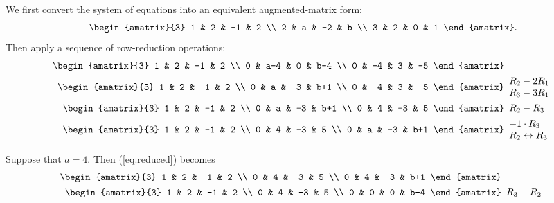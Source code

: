 \documentclass{article}
\begin{document}
We first convert the system of equations into an equivalent augmented-matrix
form:
\[
 \begin{amatrix}{3}
  1 & 2 & -1 & 2 \\
  2 & a & -2 & b \\
  3 & 2 & 0 & 1
 \end{amatrix}.
\]
Then apply a sequence of row-reduction operations:
\begin{align}
 \begin{amatrix}{3}
  1 &   2 & -1 &   2 \\
  0 & a-4 &  0 & b-4 \\
  0 &  -4 &  3 &  -5
 \end{amatrix} &  \nonumber \\
 \begin{amatrix}{3}
  1 &  2 & -1 &   2 \\
  0 &  a & -3 & b+1 \\
  0 & -4 &  3 &  -5
 \end{amatrix} & \begin{array}{l} R_2 - 2R_1 \\ R_3 - 3R_1 \end{array} 
 \nonumber \\
 \begin{amatrix}{3}
  1 & 2 & -1 &   2 \\
  0 & a & -3 & b+1 \\
  0 & 4 & -3 &   5
 \end{amatrix} &  \begin{array}{l} R_2 - R_3 \end{array}
 \nonumber \\
 \begin{amatrix}{3}
  1 & 2 & -1 &   2 \\
  0 & 4 & -3 &   5 \\
  0 & a & -3 & b+1
 \end{amatrix} &\begin{array}{l} -1 \cdot R_3 \\ R_2 \leftrightarrow R_3 \end{array}
 \label{eq:reduced}
\end{align}

Suppose that $a = 4$.  Then (\ref{eq:reduced}) becomes
\begin{align}
 \begin{amatrix}{3}
  1 & 2 & -1 &   2 \\
  0 & 4 & -3 &   5 \\
  0 & 4 & -3 & b+1
 \end{amatrix} &
 \nonumber \\
 \begin{amatrix}{3}
  1 & 2 & -1 &   2 \\
  0 & 4 & -3 &   5 \\
  0 & 0 &  0 & b-4
 \end{amatrix}&  \begin{array}{l} R_3 - R_2 \end{array}
 \label{eq:substitute_a}
\end{align}
\end{document}
